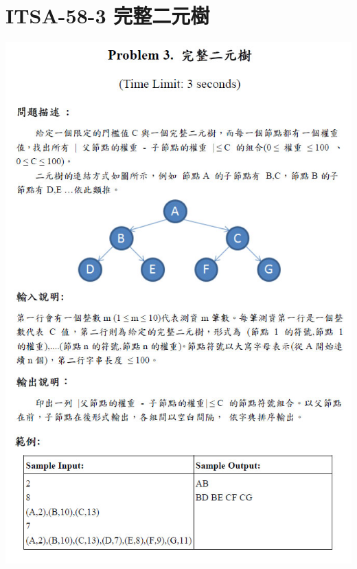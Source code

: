 \section{ITSA-58-3 完整二元樹}
\centerline{\includegraphics[height=.95\textheight]{../solutions/fig/58ITSA3}}

